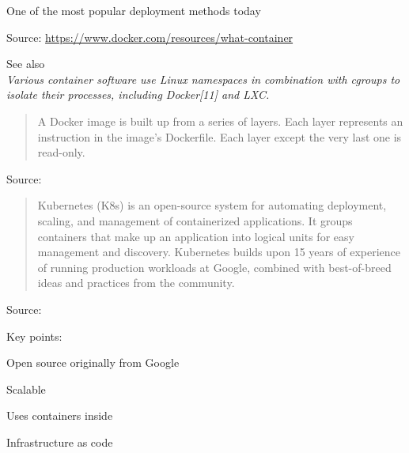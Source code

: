 \documentclass[Screen16to9,17pt]{foils}
\begin{document}
\begin{list2}
  \item One of the most popular deployment methods today
\end{list2}



Source: {\footnotesize
\url{https://www.docker.com/resources/what-container}}

\begin{list2}
  \item See also \\
   \emph{Various container software use Linux namespaces in combination with cgroups to isolate their processes, including Docker[11] and LXC.}
\end{list2}



\begin{quote}
A Docker image is built up from a series of layers. Each layer represents an instruction in the image’s Dockerfile. Each layer except the very last one is read-only.
\end{quote}

Source: {\footnotesize
{}}





\begin{quote}
  Kubernetes (K8s) is an open-source system for automating deployment, scaling, and management of containerized applications.
  It groups containers that make up an application into logical units for easy management and discovery. Kubernetes builds upon 15 years of experience of running production workloads at Google, combined with best-of-breed ideas and practices from the community.
\end{quote}
Source: {\footnotesize
{}}

Key points:
\begin{list2}
\item Open source originally from Google
\item Scalable
\item Uses containers inside
\item Infrastructure as code
\end{list2}
\end{document}
